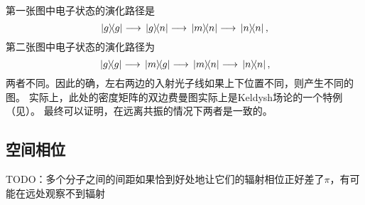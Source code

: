 第一张图中电子状态的演化路径是
\[
    \dyad{g} \longrightarrow \dyad*{g}{n} \longrightarrow \dyad*{m}{n} \longrightarrow \dyad*{n}{n},
\]
第二张图中电子状态的演化路径为
\[
    \dyad*{g} \longrightarrow \dyad*{m}{g} \longrightarrow \dyad*{m}{n} \longrightarrow \dyad*{n}{n},
\]
两者不同。因此的确，左右两边的入射光子线如果上下位置不同，则产生不同的图。
实际上，此处的密度矩阵的双边费曼图实际上是Keldysh场论的一个特例（见\cite{Hansen_2012}）。
最终可以证明，在远离共振的情况下两者是一致的。

\subsection{空间相位}

TODO：多个分子之间的间距如果恰到好处地让它们的辐射相位正好差了$\pi$，有可能在远处观察不到辐射

